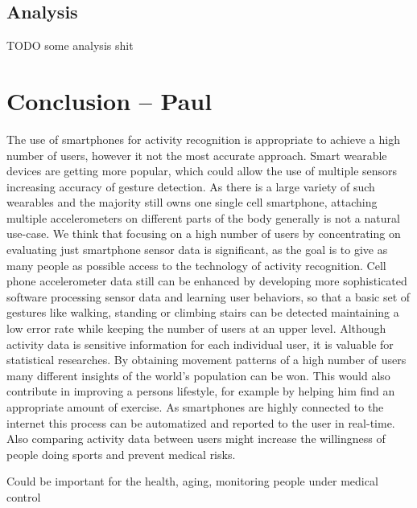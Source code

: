 \documentclass[conference]{IEEEtran}
\begin{document}
\newpage
\subsection{Analysis}

TODO some analysis shit

\section{Conclusion -- Paul}
The use of smartphones for activity recognition is appropriate to achieve a high number of users, however it not the most accurate approach.
Smart wearable devices are getting more popular, which could allow the use of multiple sensors increasing accuracy of gesture detection. As there is a large variety of such wearables and the majority still owns one single cell smartphone, attaching multiple accelerometers  on different parts of the body generally is not a natural use-case. We think that focusing on a high number of users by concentrating on evaluating just smartphone sensor data is significant, as the goal is to give as many people as possible access to the technology of activity recognition.
Cell phone accelerometer data still can be enhanced by developing more sophisticated software processing sensor data and learning user behaviors, so that a basic set of gestures like walking, standing or climbing stairs can be detected maintaining a low error rate while keeping the number of users at an upper level.
Although activity data is sensitive information for each individual user, it is valuable for statistical researches. By obtaining movement patterns of a high number of users many different insights of the world's population can be won. This would also contribute in improving a persons lifestyle, for example by helping him find an appropriate amount of exercise. As smartphones are highly connected to the internet this process can be automatized and reported to the user in real-time. Also comparing activity data between users might increase the willingness of people doing sports and prevent medical risks.

Could be important for the health, aging, monitoring people under medical control
\end{document}
